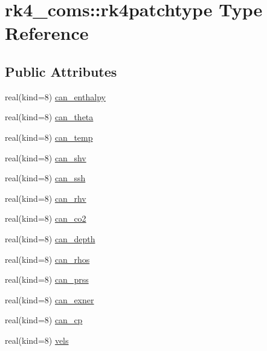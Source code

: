 \hypertarget{structrk4__coms_1_1rk4patchtype}{}\section{rk4\+\_\+coms\+:\+:rk4patchtype Type Reference}
\label{structrk4__coms_1_1rk4patchtype}
\subsection*{Public Attributes}
\begin{DoxyCompactItemize}
\item 
real(kind=8) \hyperlink{structrk4__coms_1_1rk4patchtype_aba6612f8ec4610f300a9c5ba5cecd2e9}{can\+\_\+enthalpy}
\item 
real(kind=8) \hyperlink{structrk4__coms_1_1rk4patchtype_abd2fded167b6435983e180ab92ae0823}{can\+\_\+theta}
\item 
real(kind=8) \hyperlink{structrk4__coms_1_1rk4patchtype_af3911d0e77a6e60d4654a011a3109aab}{can\+\_\+temp}
\item 
real(kind=8) \hyperlink{structrk4__coms_1_1rk4patchtype_a93e28363c792ec8efda4571da545af21}{can\+\_\+shv}
\item 
real(kind=8) \hyperlink{structrk4__coms_1_1rk4patchtype_a320ac891074a2ca8906b954af4914238}{can\+\_\+ssh}
\item 
real(kind=8) \hyperlink{structrk4__coms_1_1rk4patchtype_aecb8f675c0efd65e1dcce4f92d14fca7}{can\+\_\+rhv}
\item 
real(kind=8) \hyperlink{structrk4__coms_1_1rk4patchtype_a553d2a681729c3117c958bb103ce1b06}{can\+\_\+co2}
\item 
real(kind=8) \hyperlink{structrk4__coms_1_1rk4patchtype_a7290bf89611fdc99100a3872fe4d055c}{can\+\_\+depth}
\item 
real(kind=8) \hyperlink{structrk4__coms_1_1rk4patchtype_a6728855b83b9cc47217984e9831dd138}{can\+\_\+rhos}
\item 
real(kind=8) \hyperlink{structrk4__coms_1_1rk4patchtype_af20c0fcd0ff218f45590d8ddd28043f8}{can\+\_\+prss}
\item 
real(kind=8) \hyperlink{structrk4__coms_1_1rk4patchtype_acd37d01e4068e774a6c35cfabace60fc}{can\+\_\+exner}
\item 
real(kind=8) \hyperlink{structrk4__coms_1_1rk4patchtype_a08188abc065f040d404ce0c9b9bbdde3}{can\+\_\+cp}
\item 
real(kind=8) \hyperlink{structrk4__coms_1_1rk4patchtype_af6350a3ee829a6afd11b225c55393616}{vels}

\end{DoxyCompactItemize}
